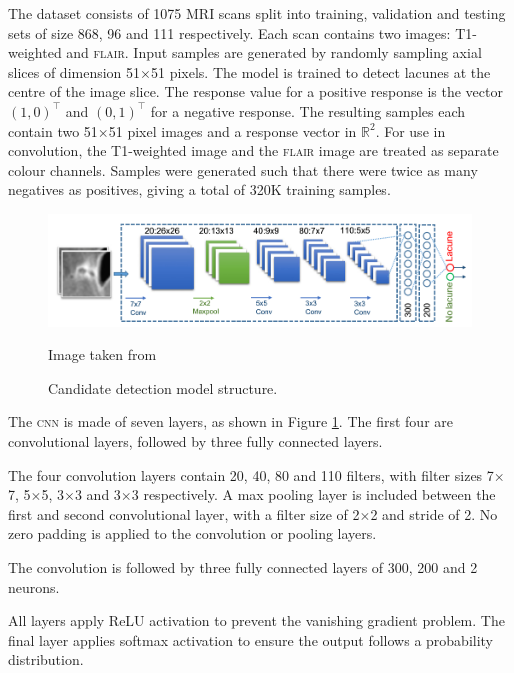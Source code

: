The dataset consists of 1075 MRI scans split into training, validation and testing sets of size 868, 96 and 111 respectively. Each scan contains two images: T1-weighted and \textsc{flair}. Input samples are generated by randomly sampling axial slices of dimension 51$\times$51 pixels. The model is trained to detect lacunes at the centre of the image slice. The response value for a positive response is the vector $(1, 0)^\top$ and $(0, 1)^\top$ for a negative response. The resulting samples each contain two 51$\times$51 pixel images and a response vector in $\mathbb{R}^2$. For use in convolution, the T1-weighted image and the \textsc{flair} image are treated as separate colour channels. Samples were generated such that there were twice as many negatives as positives, giving a total of 320K training samples.

\begin{figure}[ht]
	\centering
	\includegraphics[width=\textwidth]{Images/5_ghafoorian_model1.png}
	\caption{Candidate detection model structure.}
	\small Image taken from \cite{GhafoorianM.2017Dml3}
	\label{litrev-ghafoorian_model1fig}
\end{figure}

The \textsc{cnn} is made of seven layers, as shown in Figure \ref{litrev-ghafoorian_model1fig}. The first four are convolutional layers, followed by three fully connected layers.

The four convolution layers contain 20, 40, 80 and 110 filters, with filter sizes 7$\times$7, 5$\times$5, 3$\times$3 and 3$\times$3 respectively. A max pooling layer is included between the first and second convolutional layer, with a filter size of 2$\times$2 and stride of 2. No zero padding is applied to the convolution or pooling layers.

The convolution is followed by three fully connected layers of 300, 200 and 2 neurons.

All layers apply ReLU activation to prevent the vanishing gradient problem. The final layer applies softmax activation to ensure the output follows a probability distribution.

